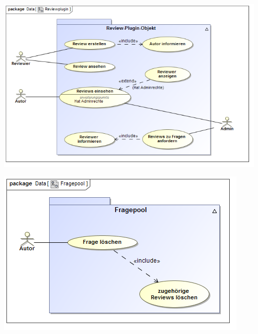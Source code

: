 \documentclass{beamer}
\begin{document}
		\begin{frame}
			\includegraphics[scale=0.45]{Diagramme/Use_Case_Diagram__Reviewplugin.png}
			\label{Reviewplugin}	
		\end{frame}
		\begin{frame}
			\includegraphics[scale=0.5]{Diagramme/Use_Case_Diagram__Fragepool.png}
				\label{Fragepool}
		\end{frame}
\end{document}
